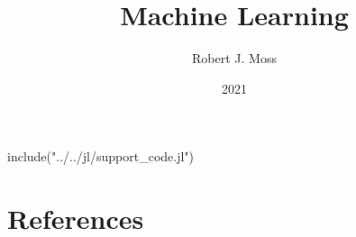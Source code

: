 \documentclass[fullbook]{tufte_algorithms_book}
\title{Machine Learning}
\author[Moss]{Robert J. Moss}
\date{2021}
\begin{document}
\begin{jlcode}
	include("../../jl/support_code.jl")
\end{jlcode}

\frontmatter

% 
% 

\tableofcontents\label{cha:toc}


% 
\mainmatter














\appendix



\navheader{\currentname}

\backmatter

\chapter*{References}
\printbibliography[heading=none]

\printindex
\end{document}
